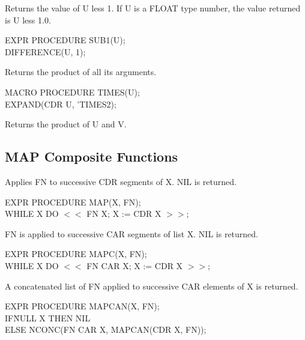 \documentclass[11pt,letterpaper]{book}
\begin{document}
{Returns the value of U less 1.  If U is a FLOAT type number, the
value returned is U less 1.0.

{\tt \begin{tabbing} EXPR PROCEDURE SUB1(U); \\
\hspace*{1em} DIFFERENCE(U, 1);
\end{tabbing}}}


{Returns the product of all its arguments.

{\tt \begin{tabbing} MACRO PROCEDURE TIMES(U); \\
\hspace*{1em} EXPAND(CDR U, 'TIMES2);
\end{tabbing}}}


{Returns the product of U and V.}


\subsection{MAP Composite Functions}


{Applies FN to successive CDR segments of X. NIL is returned.

{\tt \begin{tabbing} EXPR PROCEDURE MAP(X, FN); \\
\hspace*{1em} WHILE X DO $<<$ FN X; X := CDR X $>>$;
\end{tabbing}}}


{FN is applied to successive CAR segments of list X. NIL is returned.

{\tt \begin{tabbing} EXPR PROCEDURE MAPC(X, FN); \\
\hspace*{1em} WHILE X DO $<<$ FN CAR X; X := CDR X $>>$;
\end{tabbing}}}


{A concatenated list of FN applied to successive CAR elements of X is
returned.

{\tt \begin{tabbing} EXPR PROCEDURE MAPCAN(X, FN); \\
\hspace*{1em} IF\= NULL X THEN NIL \\
\> ELSE NCONC(FN CAR X, MAPCAN(CDR X, FN));
\end{tabbing}}}
\end{document}
